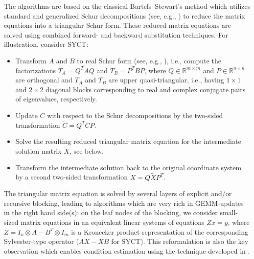 \documentclass[11pt]{article}
\begin{document}
The algorithms are based on the classical Bartels--Stewart's
method \cite{bartelsstewart72} which utilizes standard and
generalized Schur decompositions (see, e.g.,
\cite{golubvanloan96}) to reduce the matrix equations into a
triangular Schur form. These reduced matrix equations are solved using
combined forward- and backward substitution techniques. For
illustration, consider SYCT:
%
\begin{itemize}
\item Transform $A$ and $B$ to real Schur form (see, e.g.,
\cite{golubvanloan96}), i.e., compute the factorizations $T_A
=Q^TAQ$ and $T_B=P^TBP$, where $Q \in \mathbb{R}^{m \times m}$ and
$P \in \mathbb{R}^{n \times n}$ are orthogonal and $T_A$ and $T_B$
are upper quasi-triangular, i.e., having $1 \times 1$ and $2
\times 2$ diagonal blocks corresponding to real and complex
conjugate pairs of eigenvalues, respectively. \item Update $C$
with respect to the Schur decompositions by the two-sided
transformation $\tilde{C}=Q^TCP$. \item Solve the resulting
reduced triangular matrix equation for the intermediate solution
matrix $\tilde{X}$, see below. \item Transform the intermediate
solution back to the original coordinate system by a second
two-sided transformation $X=Q\tilde{X}P^T$.
\end{itemize}
%
The triangular matrix equation is solved by several layers of
explicit and/or recursive blocking, leading to algorithms which
are very rich in GEMM-updates in the right hand side(s); on the
leaf nodes of the blocking, we consider small-sized matrix
equations in an equivalent linear systems of equations $Zx=y$,
where $Z=I_{n} \otimes A - B^T \otimes I_{m}$ is a Kronecker
product representation of the corresponding Sylvester-type
operator ($AX-XB$ for SYCT). This reformulation is also the key observation which
enables condition estimation using the technique developed in
\cite{hager84,higham88,kagstromporomaa92}. \\\
\end{document}
